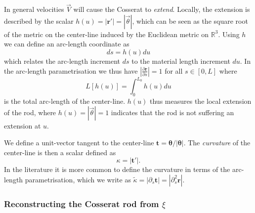In general velocities $\vec{V}$ will cause the Cosserat to \textit{extend}. Locally, the extension is described by the scalar $h(u) =  \left| \mathbf{r}' \right| = |\vec{\theta}|$, which can be seen as the square root of the metric on the center-line induced by the Euclidean metric on $\mathbb{R}^3$. Using $h$ we can define an arc-length coordinate as
\begin{equation}
ds = h(u) du
\end{equation}
which relates the arc-length increment $ds$ to the material length increment $du$. In the arc-length parametrisation we thus have $ \left| \frac{\partial \mathbf{r}}{\partial s} \right| = 1$ for all $s \in [0, L]$ where
\begin{equation}
L[h(u)] = \int_0^{L_0} h(u) du
\end{equation}
is the total arc-length of the center-line. $h(u)$ thus measures the local extension of the rod, where $h(u) = |\vec{\theta}| = 1$ indicates that the rod is not suffering an extension at $u$.

We define a unit-vector tangent to the center-line $\mathbf{t} = \boldsymbol{\theta} / |\boldsymbol{\theta}|$. The \textit{curvature} of the center-line is then a scalar defined as
\begin{equation} \label{eq:scalar curvature}
\kappa = |\mathbf{t}'|.
\end{equation}
In the literature it is more common to define the curvature in terms of the arc-length parametrisation, which we write as $\tilde{\kappa} = |\partial_s \mathbf{t}| = |\partial_s^2 \mathbf{r}|$.



\subsubsection*{Reconstructing the Cosserat rod from $\xi$} \label{sec:reconstructing the cosserat rod}


